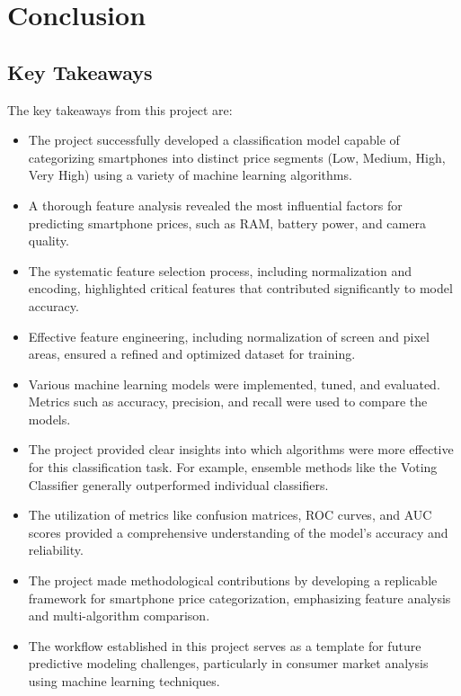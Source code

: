\documentclass[12pt]{report}
\begin{document}
\chapter{Conclusion}
\section{Key Takeaways}
The key takeaways from this project are:
\vspace{-1.25em}
\begin{itemize}
	\setlength\itemsep{-1.05em}
	\item The project successfully developed a classification model capable of categorizing smartphones into distinct price segments (Low, Medium, High, Very High) using a variety of machine learning algorithms.
	\item A thorough feature analysis revealed the most influential factors for predicting smartphone prices, such as RAM, battery power, and camera quality.
	\item The systematic feature selection process, including normalization and encoding, highlighted critical features that contributed significantly to model accuracy.
	\item Effective feature engineering, including normalization of screen and pixel areas, ensured a refined and optimized dataset for training.
	\item Various machine learning models were implemented, tuned, and evaluated. Metrics such as accuracy, precision, and recall were used to compare the models.
	\item The project provided clear insights into which algorithms were more effective for this classification task. For example, ensemble methods like the Voting Classifier generally outperformed individual classifiers.
	\item The utilization of metrics like confusion matrices, ROC curves, and AUC scores provided a comprehensive understanding of the model’s accuracy and reliability.
	\item The project made methodological contributions by developing a replicable framework for smartphone price categorization, emphasizing feature analysis and multi-algorithm comparison.
	\item The workflow established in this project serves as a template for future predictive modeling challenges, particularly in consumer market analysis using machine learning techniques.
\end{itemize}
\end{document}
